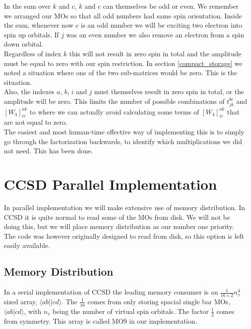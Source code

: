 In the sum over $k$ and $c$, $k$ and $c$ can themselves be odd or even. We remember we arranged our MOs so that all odd numbers had same spin orientation. Inside the sum, whenever now $c$ is an odd number we will be exciting two electron into spin up orbitals. If $j$ was an even number we also remove an electron from a spin down orbital. \\

Regardless of index $k$ this will not result in zero spin in total and the amplitude must be equal to zero with our spin restriction. In section \ref{compact_storage} we noted a situation where one of the two sub-matrices would be zero. This is the situation. \\

Also, the indexes $a$, $b$, $i$ and $j$ must themselves result in zero spin in total, or the amplitude will be zero. This limits the number of possible combinations of $t_{jk}^{bc}$ and $[W_4]_{ic}^{ak}$ to where we can actually avoid calculating some terms of $[W_4]_{ic}^{ak}$ that are not equal to zero. \\

The easiest and most human-time effective way of implementing this is to simply go through the factorization backwards, to identify which multiplications we did not need. This has been done.

\section{CCSD Parallel Implementation}
In parallel implementation we will make extensive use of memory distribution. In CCSD it is quite normal to read some of the MOs from disk. We will not be doing this, but we will place memory distribution as our number one priority. The code was however originally designed to read from disk, so this option is left easily available.

\subsection{Memory Distribution \label{kriseseksjon}}
In a serial implementation of CCSD the leading memory consumer is an $\frac{1}{16 \times 2} n_v^4$ sized array, $\langle ab||cd \rangle$. The $\frac{1}{16}$ comes from only storing spacial single bar MOs, $\langle ab|cd \rangle$, with $n_v$ being the number of virtual spin orbitals. The factor $\frac{1}{2}$ comes from symmetry. This array is called MO9 in our implementation. \\

